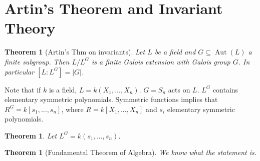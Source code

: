 \documentclass{article}
\theoremstyle{definition}
\theoremstyle{remark}
\theoremstyle{plain}
\newtheorem{thm}[defn]{Theorem}
\begin{document}
\section{Artin's Theorem and Invariant Theory}
\begin{thm}[Artin's Thm on invariants]
Let $L$ be a field and $G\subseteq \operatorname{Aut}(L)$ a finite subgroup. Then $L/L^G$ is a finite Galois extension with Galois group $G$. In particular $[L:L^G]=|G|$.    
\end{thm}
Note that if $k$ is a field, $L=k(X_1,...,X_n)$. $G=S_n$ acts on $L$. $L^G$ contains elementary symmetric polynomials. Symmetric functions implies that $R^G=k[s_1,...,s_n]$, where $R=k[X_1,...,X_n]$ and $s_i$ elementary symmetric polynomials.
\begin{thm}
    Let $L^G=k(s_1,...,s_n)$.
\end{thm}
\begin{thm}[Fundamental Theorem of Algebra]
    We know what the statement is.
\end{thm}
\end{document}
